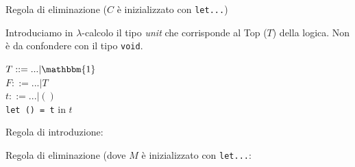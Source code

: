 \documentclass{article}
\begin{document}
\noindent Regola di eliminazione ($C$ è inizializzato con \verb|let...|)

\bigskip

\begin{minipage}{0.49\textwidth}
\end{minipage}
{
\hspace{2em}
\begin{minipage}{0.49\textwidth}
\end{minipage}}

\bigskip

\noindent Introduciamo in $\lambda$-calcolo il tipo \textit{unit} che corrisponde al Top ($T$) della logica. Non è da confondere con il tipo \verb|void|.

\bigskip

\noindent $T ::= ... | \mathbbm{1}$ \\
$F ::= ... | T$\\
$t ::= ...| ()$ \\
\verb|let () = t| in $t$

\bigskip

\noindent Regola di introduzione:

\bigskip


\begin{minipage}{0.49\textwidth}
\end{minipage}
{
\hspace{2em}
\begin{minipage}{0.49\textwidth}
\end{minipage}}

\bigskip

\noindent Regola di eliminazione (dove $M$ è inizializzato con \verb|let...|:

\bigskip

\begin{minipage}{0.49\textwidth}
\end{minipage}
{
\hspace{2em}
\begin{minipage}{0.49\textwidth}
\end{minipage}}
\end{document}
